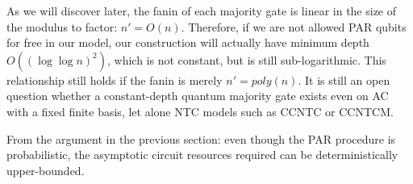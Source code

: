 As we will discover later, the fanin of each majority gate is
linear in the size of the modulus to factor: $n' = O(n)$.
Therefore, if we are not allowed PAR qubits for free in our model,
our construction will actually have minimum depth $O((\log\log n)^2)$,
which is not constant, but is still sub-logarithmic. This relationship still
holds if the fanin is merely $n' = poly(n)$. It is still an
open question \cite{Hoyer2002} whether a constant-depth
quantum majority gate exists even on \textsf{AC} with a fixed finite basis,
let alone \textsf{NTC} models such as \textsf{CCNTC} or \textsf{CCNTCM}.

From the argument in the previous section: even though the PAR procedure is
probabilistic, the asymptotic circuit resources required can be
deterministically upper-bounded.